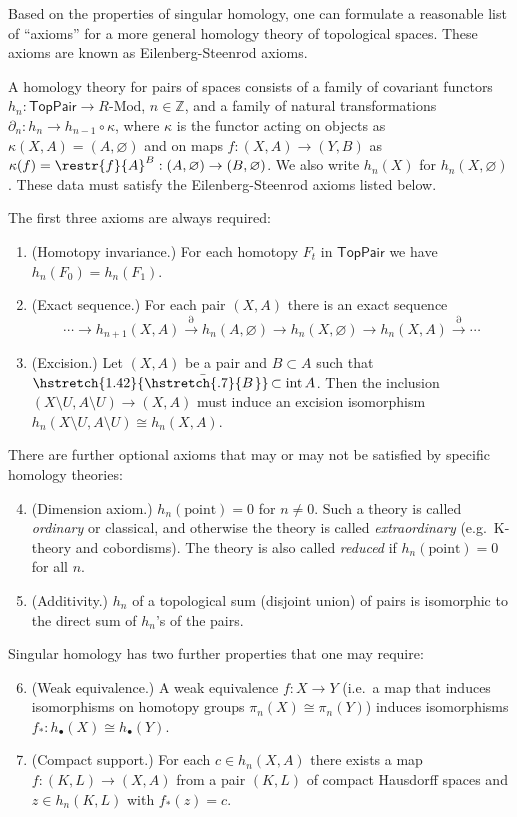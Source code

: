 \documentclass[english,letterpaper]{article}%
\numberwithin{equation}{section}
\numberwithin{figure}{section}
\numberwithin{table}{section}
\theoremstyle{definition}
\theoremstyle{definition}
\theoremstyle{definition}
\theoremstyle{plain}
\theoremstyle{plain}
\theoremstyle{plain}
\theoremstyle{plain}
\theoremstyle{remark}
\theoremstyle{remark}
\newcommand{\bbZ}{\mathbb{Z}}
\DeclareMathOperator{\Int}{int}
\newcommand\wb[1]{\hstretch{1.42}{\bar{\hstretch{.7}{#1\mkern2mu}}}\mkern-2mu}
\begin{document}
Based on the properties of singular homology, one can formulate a reasonable list of ``axioms'' for a more general homology theory of topological spaces. These axioms are known as Eilenberg-Steenrod axioms.

\begin{defn}
    A homology theory for pairs of spaces consists of a family of covariant functors $h_n:\mathsf{TopPair}\to R\text{-Mod}$, $n\in\bbZ$, and a family of natural transformations $\partial_n:h_n\to h_{n-1}\circ\kappa$, where $\kappa$ is the functor acting on objects as $\kappa(X,A)=(A,\varnothing)$ and on maps $f:(X,A)\to (Y,B)$ as $\kappa(f)=\restr{f}{A}^B:(A,\varnothing)\to (B,\varnothing)$. We also write $h_n(X)$ for $h_n(X,\varnothing)$. These data must satisfy the Eilenberg-Steenrod axioms listed below.
\end{defn}

The first three axioms are always required:
\begin{enumerate}
    \item (Homotopy invariance.) For each homotopy $F_t$ in $\mathsf{TopPair}$ we have $h_n(F_0)=h_n(F_1)$.
    \item (Exact sequence.) For each pair $(X,A)$ there is an exact sequence
    \[\cdots\to h_{n+1}(X,A)\overset{\partial}\to h_n(A,\varnothing)\to h_n(X,\varnothing)\to h_n(X,A)\overset\partial\to\cdots\]
    \item (Excision.) Let $(X,A)$ be a pair and $B\subset A$ such that $\wb{B}\subset \Int A$. Then the inclusion $(X\setminus U,A\setminus U)\to (X,A)$ must induce an excision isomorphism $h_n(X\setminus U,A\setminus U)\cong h_n(X,A)$.
\end{enumerate}

There are further optional axioms that may or may not be satisfied by specific homology theories:
\begin{enumerate}
    \setcounter{enumi}{3}
    \item (Dimension axiom.) $h_n(\text{point})=0$ for $n\neq 0$. Such a theory is called \emph{ordinary} or classical, and otherwise the theory is called \emph{extraordinary} (e.g.\ K-theory and cobordisms). The theory is also called \emph{reduced} if $h_n(\text{point})=0$ for all $n$.
    \item (Additivity.) $h_n$ of a topological sum (disjoint union) of pairs is isomorphic to the direct sum of $h_n$'s of the pairs.
\end{enumerate}
Singular homology has two further properties that one may require:
\begin{enumerate}
    \setcounter{enumi}{5}
     \item (Weak equivalence.) A weak equivalence $f:X\to Y$ (i.e.\ a map that induces isomorphisms on homotopy groups $\pi_n(X)\cong \pi_n(Y)$) induces isomorphisms $f_\ast:h_\bullet(X)\cong h_\bullet(Y)$.
    \item (Compact support.)  For each $c\in h_n(X,A)$ there exists a map $f:(K,L)\to (X,A)$ from a pair $(K,L)$ of compact Hausdorff spaces and $z\in h_n(K,L)$ with $f_\ast(z)=c$.
\end{enumerate}   
\end{document}
